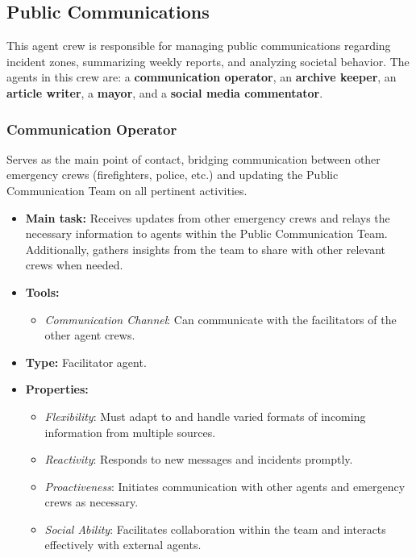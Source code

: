 \subsection{Public Communications}

This agent crew is responsible for managing public communications regarding incident zones, summarizing weekly reports, and analyzing societal behavior. The agents in this crew are: a \textbf{communication operator}, an \textbf{archive keeper}, an \textbf{article writer}, a \textbf{mayor}, and a \textbf{social media commentator}.

\subsubsection{Communication Operator}

Serves as the main point of contact, bridging communication between other emergency crews (firefighters, police, etc.) and updating the Public Communication Team on all pertinent activities.

\begin{itemize}
    \item \textbf{Main task:} Receives updates from other emergency crews and relays the necessary information to agents within the Public Communication Team. Additionally, gathers insights from the team to share with other relevant crews when needed.
    \item \textbf{Tools:} 
    \begin{itemize}
        \item \textit{Communication Channel}: Can communicate with the facilitators of the other agent crews.
    \end{itemize}
    \item \textbf{Type:} Facilitator agent.
    \item \textbf{Properties:}
    \begin{itemize}
        \item \emph{Flexibility}: Must adapt to and handle varied formats of incoming information from multiple sources.
        \item \emph{Reactivity}: Responds to new messages and incidents promptly.
        \item \emph{Proactiveness}: Initiates communication with other agents and emergency crews as necessary.
        \item \emph{Social Ability}: Facilitates collaboration within the team and interacts effectively with external agents.
    \end{itemize}
\end{itemize}

